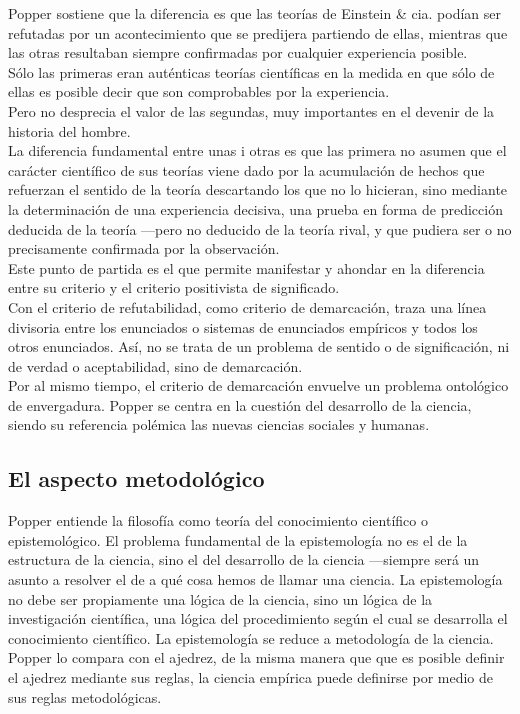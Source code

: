 \documentclass[a4paper, 11pt, twocolumn, spanish]{article}
\begin{document}
Popper sostiene que la diferencia es que las teorías de Einstein \&
cia. podían ser refutadas por un acontecimiento que se predijera
partiendo de ellas, mientras que las otras resultaban siempre
confirmadas por cualquier experiencia posible.\\[0pt]
Sólo las primeras eran auténticas teorías científicas en la medida en
que sólo de ellas es posible decir que son comprobables por la
experiencia.\\[0pt]
Pero no desprecia el valor de las segundas, muy importantes en el
devenir de la historia del hombre.\\[0pt]


La diferencia fundamental entre unas i otras es que las primera no
asumen que el carácter científico de sus teorías viene dado por la
acumulación de hechos que refuerzan el sentido de la teoría
descartando los que no lo hicieran, sino mediante la determinación de
una experiencia decisiva, una prueba en forma de predicción deducida
de la teoría —pero no deducido de la teoría rival, y que pudiera ser o
no precisamente confirmada por la observación.\\[0pt]

Este punto de partida es el que permite manifestar y ahondar en la
diferencia entre su criterio y el criterio positivista de
significado.\\[0pt]
Con el criterio de refutabilidad, como criterio de demarcación, traza
una línea divisoria entre los enunciados o sistemas de enunciados
empíricos y todos los otros enunciados. Así, no se trata de un
problema de sentido o de significación, ni de verdad o aceptabilidad,
sino de demarcación.\\[0pt]

Por al mismo tiempo, el criterio de demarcación envuelve un problema
ontológico de envergadura. Popper se centra en la cuestión del
desarrollo de la ciencia, siendo su referencia polémica las nuevas
ciencias sociales y humanas.

\subsection{El aspecto metodológico}
\label{sec:org3a0fdba}
Popper entiende la filosofía como teoría del conocimiento científico o
epistemológico. El problema fundamental de la epistemología no es el
de la estructura de la ciencia, sino el del desarrollo de la ciencia
—siempre será un asunto a resolver el de a qué cosa hemos de llamar
una ciencia. La epistemología no debe ser propiamente una lógica de la
ciencia, sino un lógica de la investigación científica, una lógica del
procedimiento según el cual se desarrolla el conocimiento
científico. La epistemología se reduce a metodología de la ciencia.\\[0pt]
Popper lo compara con el ajedrez, de la misma manera que que es
posible definir el ajedrez mediante sus reglas, la ciencia empírica
puede definirse por medio de sus reglas metodológicas.\\[0pt]
\end{document}
